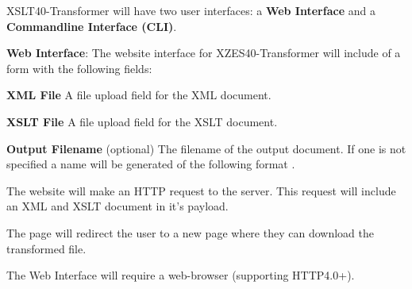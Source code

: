 XSLT40-Transformer will have two user interfaces: a \textbf{Web Interface} and a \textbf{Commandline Interface (CLI)}.

\begin{description}
    \item {
        \textbf{Web Interface}:
        The website interface for XZES40-Transformer will include of a form with the following fields:
        \begin{description}
            \item {
              \textbf{XML File} A file upload field for the XML document.
            }
            \item {
              \textbf{XSLT File} A file upload field for the XSLT document.
            }
            \item {
              \textbf{Output Filename} (optional)
              The filename of the output document.
              If one is not specified a name will be generated of the following format .
            }
        \end{description}

        The website will make an HTTP  request to the server.
        This  request will include an XML and XSLT document in it's payload.

        The page will redirect the user to a new page where they can download the transformed file.

        The Web Interface will require a web-browser (supporting HTTP4.0+).
        
}
\end{description}
